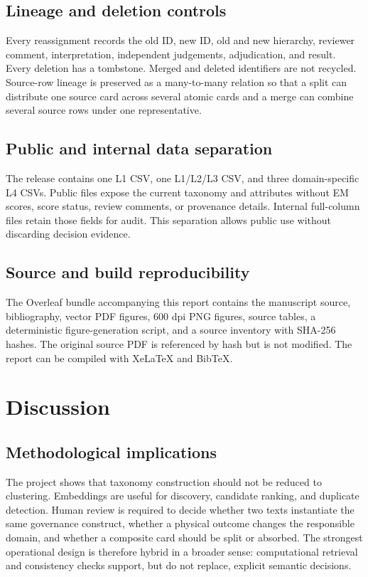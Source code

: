 \documentclass[10pt,a4paper]{article}
\begin{document}
\subsection{Lineage and deletion controls}

Every reassignment records the old ID, new ID, old and new hierarchy, reviewer comment, interpretation, independent judgements, adjudication, and result. Every deletion has a tombstone. Merged and deleted identifiers are not recycled. Source-row lineage is preserved as a many-to-many relation so that a split can distribute one source card across several atomic cards and a merge can combine several source rows under one representative.

\subsection{Public and internal data separation}

The release contains one L1 CSV, one L1/L2/L3 CSV, and three domain-specific L4 CSVs. Public files expose the current taxonomy and attributes without EM scores, score status, review comments, or provenance details. Internal full-column files retain those fields for audit. This separation allows public use without discarding decision evidence.

\subsection{Source and build reproducibility}

The Overleaf bundle accompanying this report contains the manuscript source, bibliography, vector PDF figures, 600 dpi PNG figures, source tables, a deterministic figure-generation script, and a source inventory with SHA-256 hashes. The original source PDF is referenced by hash but is not modified. The report can be compiled with XeLaTeX and BibTeX.

\section{Discussion}

\subsection{Methodological implications}

The project shows that taxonomy construction should not be reduced to clustering. Embeddings are useful for discovery, candidate ranking, and duplicate detection. Human review is required to decide whether two texts instantiate the same governance construct, whether a physical outcome changes the responsible domain, and whether a composite card should be split or absorbed. The strongest operational design is therefore hybrid in a broader sense: computational retrieval and consistency checks support, but do not replace, explicit semantic decisions.
\end{document}
